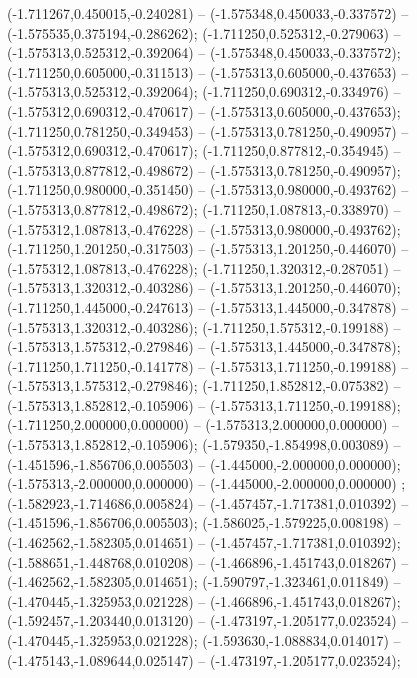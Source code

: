  (-1.711267,0.450015,-0.240281) -- (-1.575348,0.450033,-0.337572) -- (-1.575535,0.375194,-0.286262);
 (-1.711250,0.525312,-0.279063) -- (-1.575313,0.525312,-0.392064) -- (-1.575348,0.450033,-0.337572);
 (-1.711250,0.605000,-0.311513) -- (-1.575313,0.605000,-0.437653) -- (-1.575313,0.525312,-0.392064);
 (-1.711250,0.690312,-0.334976) -- (-1.575312,0.690312,-0.470617) -- (-1.575313,0.605000,-0.437653);
 (-1.711250,0.781250,-0.349453) -- (-1.575313,0.781250,-0.490957) -- (-1.575312,0.690312,-0.470617);
 (-1.711250,0.877812,-0.354945) -- (-1.575313,0.877812,-0.498672) -- (-1.575313,0.781250,-0.490957);
 (-1.711250,0.980000,-0.351450) -- (-1.575313,0.980000,-0.493762) -- (-1.575313,0.877812,-0.498672);
 (-1.711250,1.087813,-0.338970) -- (-1.575312,1.087813,-0.476228) -- (-1.575313,0.980000,-0.493762);
 (-1.711250,1.201250,-0.317503) -- (-1.575313,1.201250,-0.446070) -- (-1.575312,1.087813,-0.476228);
 (-1.711250,1.320312,-0.287051) -- (-1.575313,1.320312,-0.403286) -- (-1.575313,1.201250,-0.446070);
 (-1.711250,1.445000,-0.247613) -- (-1.575313,1.445000,-0.347878) -- (-1.575313,1.320312,-0.403286);
 (-1.711250,1.575312,-0.199188) -- (-1.575313,1.575312,-0.279846) -- (-1.575313,1.445000,-0.347878);
 (-1.711250,1.711250,-0.141778) -- (-1.575313,1.711250,-0.199188) -- (-1.575313,1.575312,-0.279846);
 (-1.711250,1.852812,-0.075382) -- (-1.575313,1.852812,-0.105906) -- (-1.575313,1.711250,-0.199188);
 (-1.711250,2.000000,0.000000) -- (-1.575313,2.000000,0.000000) -- (-1.575313,1.852812,-0.105906);
 (-1.579350,-1.854998,0.003089) -- (-1.451596,-1.856706,0.005503) -- (-1.445000,-2.000000,0.000000);
 (-1.575313,-2.000000,0.000000) -- (-1.445000,-2.000000,0.000000) ;
 (-1.582923,-1.714686,0.005824) -- (-1.457457,-1.717381,0.010392) -- (-1.451596,-1.856706,0.005503);
 (-1.586025,-1.579225,0.008198) -- (-1.462562,-1.582305,0.014651) -- (-1.457457,-1.717381,0.010392);
 (-1.588651,-1.448768,0.010208) -- (-1.466896,-1.451743,0.018267) -- (-1.462562,-1.582305,0.014651);
 (-1.590797,-1.323461,0.011849) -- (-1.470445,-1.325953,0.021228) -- (-1.466896,-1.451743,0.018267);
 (-1.592457,-1.203440,0.013120) -- (-1.473197,-1.205177,0.023524) -- (-1.470445,-1.325953,0.021228);
 (-1.593630,-1.088834,0.014017) -- (-1.475143,-1.089644,0.025147) -- (-1.473197,-1.205177,0.023524);
